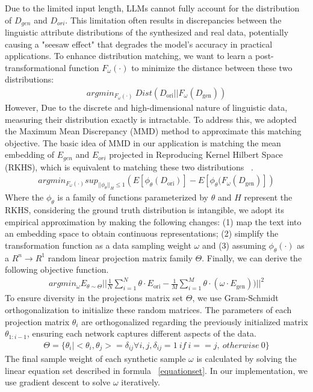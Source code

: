 Due to the limited input length, LLMs cannot fully account for the distribution of $D_{gen}$ and $D_{ori}$. This limitation often results in discrepancies between the linguistic attribute distributions of the synthesized and real data, potentially causing a "seesaw effect" that degrades the model's accuracy in practical applications. To enhance distribution matching, we want to learn a post-transformational function $F_\omega(\cdot)$ to minimize the distance between these two distributions:
\begin{align}
argmin_{F_\omega(\cdot)}\ Dist(D_{\text{ori}} || F_\omega(D_{\text{gen}}))
\end{align}
However, Due to the discrete and high-dimensional nature of linguistic data, measuring their distribution exactly is intractable. To address this, we adopted the Maximum Mean Discrepancy (MMD) method to approximate this matching objective. The basic idea of MMD in our application is matching the mean embedding of $E_{gen}$ and $E_{ori}$ projected in Reproducing Kernel Hilbert Space (RKHS), which is equivalent to matching these two distributions ~\cite{zhao2023dataset}.  
\begin{align}
argmin_{F_\omega(\cdot)}
sup_{||\phi_\theta||_H\leq 1} (
E\left [\phi_\theta(D_{\text{ori}})\right ] - 
E\left [\phi_\theta (F_\omega(D_{\text{gen}})\right ])
\end{align}
Where the $\phi_\theta$ is a family of functions parameterized by $\theta$ and $H$ represent the RKHS, considering the ground truth distribution is intangible, we adopt its empirical approximation by making the following changes: (1) map the text into an embedding space to obtain continuous representations; (2) simplify the transformation function as a data sampling weight $\omega$ and (3) assuming $\phi_\theta(\cdot)$ as a $R^n\rightarrow R^1$ random linear projection matrix family $\Theta$. Finally, we can derive the following objective function.
 \begin{align}
argmin_{\omega} E_{\theta\sim \Theta}||\frac{1}{N}\sum_{i=1}^{N}\theta\cdot E_{\text{ori}} - \frac{1}{M}\sum_{i=1}^{M}\theta\cdot (\omega \cdot E_{\text{gen}}))||^2
\label{equationset}
\end{align}
To ensure diversity in the projections matrix set $\Theta$, we use Gram-Schmidt orthogonalization\citep{Gram_Schmidt} to initialize these random matrices. The parameters of each projection matrix $\theta_{i}$ are orthogonalized regarding the previously initialized matrix $\theta_{1:i-1}$, ensuring each network captures different aspects of the data.
 \begin{align}
\Theta = \{\theta_i|<\theta_i,\theta_j>=\delta_{ij}\forall i, j, \delta_{ij} =1\ if\ i==j,\ otherwise\ 0\}
\end{align}
The final sample weight of each synthetic sample $\omega$ is calculated by solving the linear equation set described in formula ~\ref{equationset}. In our implementation, we use gradient descent to solve $\omega$ iteratively.

